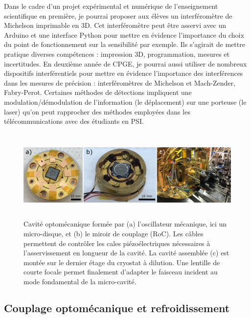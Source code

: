 \documentclass[12pt,a4paper]{article}
\newcommand{\uroc}{\micro RoC}
\newenvironment{mep}{%
\addcontentsline{ldf}{figure}{0}%
\begin{mep_env}
\small}
{\end{mep_env}}
\begin{document}
\begin{mep}
Dans le cadre d'un projet expérimental et numérique de l'enseignement scientifique en première, je pourrai proposer aux élèves un interféromètre de Michelson imprimable en 3D.
Cet interféromètre peut être asservi avec un Arduino et une interface Python pour mettre en évidence l'importance du choix du point de fonctionnement sur la sensibilité par exemple.
Ils s'agirait de mettre pratique diverses compétences : impression 3D, programmation, mesures et incertitudes.
En deuxième année de CPGE, je pourrai aussi utiliser de nombreux dispositifs interférentiels pour mettre en évidence l'importance des interférences dans les mesures de précision : interféromètres de Michelson et Mach-Zender, Fabry-Perot.
Certaines méthodes de détections impliquent une modulation/démodulation de l'information (le déplacement) sur une porteuse (le laser) qu'on peut rapprocher des méthodes employées dans les télécommunications avec des étudiants en PSI.
\end{mep}

\begin{figure}
\center
\includegraphics[height=129pt]{figures/optomechanical_cavity.png}
\caption{Cavité optomécanique formée par (a) l'oscillateur mécanique, ici un micro-disque, et (b) le miroir de couplage (\uroc).
Les câbles permettent de contrôler les cales piézoélectriques nécessaires à l'asservissement en longueur de la cavité.
La cavité assemblée (c) est montée sur le dernier étage du cryostat à dilution.
Une lentille de courte focale permet finalement d'adapter le faisceau incident au mode fondamental de la micro-cavité.}
\label{fig:cavity}
\end{figure}

\subsection{Couplage optomécanique et refroidissement}
\label{sec:optomechanics}
\end{document}
